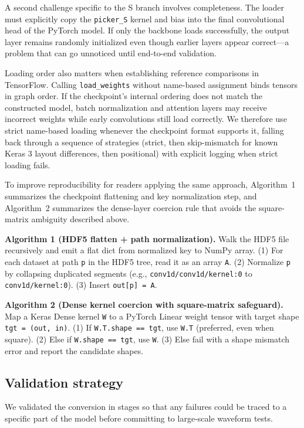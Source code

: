 A second challenge specific to the S branch involves completeness. The loader must explicitly copy the \texttt{picker\_S} kernel and bias into the final convolutional head of the PyTorch model. If only the backbone loads successfully, the output layer remains randomly initialized even though earlier layers appear correct---a problem that can go unnoticed until end-to-end validation.

Loading order also matters when establishing reference comparisons in TensorFlow. Calling \texttt{load\_weights} without name-based assignment binds tensors in graph order. If the checkpoint's internal ordering does not match the constructed model, batch normalization and attention layers may receive incorrect weights while early convolutions still load correctly. We therefore use strict name-based loading whenever the checkpoint format supports it, falling back through a sequence of strategies (strict, then skip-mismatch for known Keras 3 layout differences, then positional) with explicit logging when strict loading fails.

To improve reproducibility for readers applying the same approach, Algorithm~1 summarizes the checkpoint flattening and key normalization step, and Algorithm~2 summarizes the dense-layer coercion rule that avoids the square-matrix ambiguity described above.

\textbf{Algorithm 1 (HDF5 flatten + path normalization).} Walk the HDF5 file recursively and emit a flat dict from normalized key to NumPy array.
(1) For each dataset at path \texttt{p} in the HDF5 tree, read it as an array \texttt{A}.
(2) Normalize \texttt{p} by collapsing duplicated segments (e.g., \texttt{conv1d/conv1d/kernel:0} to \texttt{conv1d/kernel:0}).
(3) Insert \texttt{out[p] = A}.

\textbf{Algorithm 2 (Dense kernel coercion with square-matrix safeguard).} Map a Keras Dense kernel \texttt{W} to a PyTorch Linear weight tensor with target shape \texttt{tgt = (out, in)}.
(1) If \texttt{W.T.shape == tgt}, use \texttt{W.T} (preferred, even when square).
(2) Else if \texttt{W.shape == tgt}, use \texttt{W}.
(3) Else fail with a shape mismatch error and report the candidate shapes.

\subsection{Validation strategy}

We validated the conversion in stages so that any failures could be traced to a specific part of the model before committing to large-scale waveform tests.

